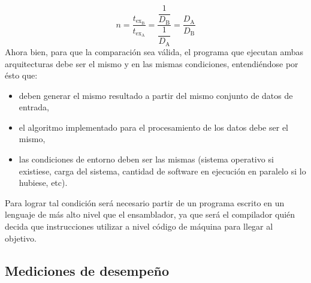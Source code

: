 \begin{equation}
  \label{eq:performance-performance_ratio}
    n = \dfrac{ t_{\text{ex}_{\text{B}}} } { t_{\text{ex}_{\text{A}}} } = 
\dfrac{ \dfrac{ 1 } { D_{\text{B}}} } { \dfrac{ 1 } { D_{\text{A}} } } = 
\dfrac{ D_{\text{A}} } { D_{\text{B}} }
\end{equation}
Ahora bien, para que la comparación sea válida, el programa que ejecutan ambas 
arquitecturas debe ser el mismo y en las mismas condiciones, entendiéndose por 
ésto que:
\begin{itemize}
  \item deben generar el mismo resultado a partir del mismo conjunto de 
datos de entrada,
  \item el algoritmo implementado para el procesamiento de los datos debe ser 
el mismo,
  \item las condiciones de entorno deben ser las mismas (sistema operativo si 
existiese, carga del sistema, cantidad de software en ejecución en paralelo si 
lo hubiese, etc).
\end{itemize}
Para lograr tal condición será necesario partir de un programa escrito en un 
lenguaje de más alto nivel que el ensamblador, ya que será el compilador quién 
decida que instrucciones utilizar a nivel código de máquina para llegar al 
objetivo.

\subsection{Mediciones de desempeño}
\label{subsec:performance-measuring}

